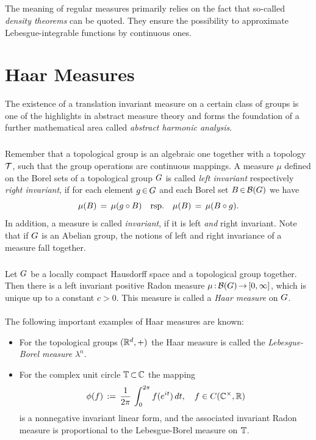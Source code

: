 \documentclass[11pt,twoside]{article}
\begin{document}
\subparagraph{}
The meaning of regular measures primarily relies on the fact
that so-called \textit{density theorems} can be quoted.
They ensure the possibility to approximate Lebesgue-integrable functions
by continuous ones.

\section{Haar Measures}
The existence of a translation invariant measure on a certain class of groups
is one of the highlights in abstract measure theory and
forms the foundation of a further mathematical area
called \textit{abstract harmonic analysis}.
 
\subparagraph{}
Remember
that a topological group is an algebraic one together with a topology $\topT$,
such that the group operations are continuous mappings.
A measure $\mu$ defined on the Borel sets of a topological group $\topG$
is called \textit{left invariant} respectively \textit{right invariant},
if for each element $g \xeof \topG$ and each Borel set
$B \xeof \cal{B}(\topG)$ we have
\[
\mu(B) \= \mu(g \circ B) \quad \mbox{rsp.} \quad
\mu(B) \= \mu(B \circ g).
\]
In addition,
a measure is called \textit{invariant},
if it is left \textit{and} right invariant.
Note
that if $\topG$ is an Abelian group,
the notions of left and right invariance of a measure fall together.

\subparagraph{}
Let $\topG$ be a locally compact Hausdorff space
and a topological group together.
Then there is a left invariant positive Radon measure
$\mu \: \cal{B}(\topG) \xto [0,\infty]$,
which is unique up to a constant $c > 0$.  
This measure is called a \textit{Haar measure} on $\topG$.

\paragraph{}
The following important examples of Haar measures are known:

\begin{itemize}[leftmargin=22pt]
\item[1.]
For the topological groups $(\R^d,+)$ the Haar measure is called the
\textit{Lebesgue-Borel measure} $\lambda^n$.

\item[2.]
For the complex unit circle $\Torus \xsubset \C$ the mapping
\[
\phi(f) \eqdef
\frac{1}{2\pi} \, \int_0^{2\pi} f(e^{it})\,dt, \quad f \in C(\C^{\times},\R)
\]
is a nonnegative invariant linear form,
and the associated invariant Radon measure is proportional
to the Lebesgue-Borel measure on $\Torus$.
\end{itemize}
\end{document}
